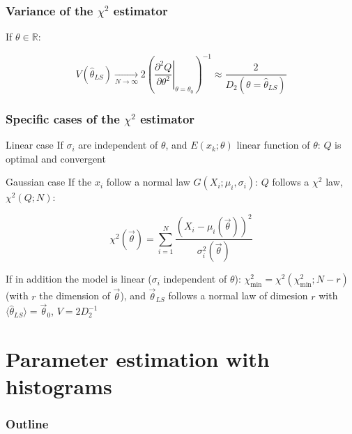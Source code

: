 \documentclass[9pt]{beamer}
\begin{document}
\begin{frame}
 \frametitle{Variance of the $\chi^2$ estimator}
 
 If $\theta \in \mathbb{R}$:
 
 $$V(\hat{\theta}_{LS}) \xrightarrow[N\to\infty]{} 2\left(\left.\frac{\partial^2 Q}{\partial\theta^2}\right|_{\theta=\theta_0}\right)^{-1} \approx \frac{2}{D_2(\theta=\hat{\theta}_{LS})}$$
\end{frame}


\begin{frame}
 \frametitle{Specific cases of the $\chi^2$ estimator}
 
 \begin{block}{Linear case}
  If $\sigma_i$ are independent of $\theta$, and $E(x_k;\theta)$ linear function of $\theta$: $Q$ is optimal and convergent
 \end{block}
 
 \begin{block}{Gaussian case}
  If the $x_i$ follow a normal law $G(X_i;\mu_i,\sigma_i)$: $Q$ follows a $\chi^2$ law, $\chi^2(Q;N)$:
  
  $$\chi^2(\vec{\theta}) = \sum_{i=1}^N \frac{\left( X_i - \mu_i (\vec{\theta})\right)^2}{\sigma_i^2 (\vec{\theta})}$$
  
  If in addition the model is linear ($\sigma_i$ independent of $\theta$): $\chi^2_\text{min} = \chi^2 (\chi^2_\text{min};N-r)$ (with $r$ the dimension of $\vec{\theta}$), and $\vec{\theta}_{LS}$ follows a normal law of dimesion $r$ with $\langle \hat{\theta}_{LS}\rangle = \vec{\theta}_0$, $V = 2 D_2^{-1}$
  
 \end{block}


\end{frame}

\section{Parameter estimation with histograms}

\begin{frame}
 \frametitle{Outline}
 
 \tableofcontents[current]
\end{frame}
\end{document}
